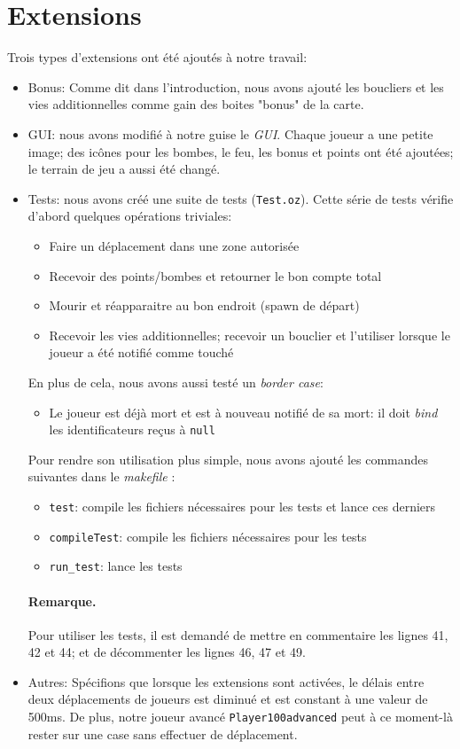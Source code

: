 \documentclass{article}
\begin{document}
\section{Extensions}
Trois types d'extensions ont été ajoutés à notre travail:
\begin{itemize}
	\item Bonus: Comme dit dans l'introduction, nous avons ajouté les boucliers et les vies additionnelles comme gain des boites "bonus" de la carte.
	\item GUI: nous avons modifié à notre guise le \emph{GUI}. Chaque joueur a une petite image; des icônes pour les bombes, le feu, les bonus et points ont été ajoutées; le terrain de jeu a aussi été changé.
	\item Tests: nous avons créé une suite de tests (\texttt{Test.oz}). Cette série de tests vérifie d'abord quelques opérations triviales:
		\begin{itemize}
			\item Faire un déplacement dans une zone autorisée
			\item Recevoir des points/bombes et retourner le bon compte total
			\item Mourir et réapparaitre au bon endroit (spawn de départ)
			\item Recevoir les vies additionnelles; recevoir un bouclier et l'utiliser lorsque le joueur a été notifié comme touché
		\end{itemize}
	En plus de cela, nous avons aussi testé un \emph{border case}:
		\begin{itemize}
			\item Le joueur est déjà mort et est à nouveau notifié de sa mort: il doit \emph{bind} les identificateurs reçus à \texttt{null}
			
		\end{itemize}
	Pour rendre son utilisation plus simple, nous avons ajouté les commandes suivantes dans le \emph{makefile} :
	\begin{itemize}
		\item \texttt{test}: compile les fichiers nécessaires pour les tests et lance ces derniers
		\item \texttt{compileTest}: compile les fichiers nécessaires pour les tests
		\item \texttt{run\_test}: lance les tests
	\end{itemize}
	\paragraph{Remarque.}Pour utiliser les tests, il est demandé de mettre en commentaire les lignes 41, 42 et 44; et de décommenter les lignes 46, 47 et 49.
	\item Autres: Spécifions que lorsque les extensions sont activées, le délais entre deux déplacements de joueurs est diminué et est constant à une valeur de 500ms. De plus, notre joueur avancé \texttt{Player100advanced} peut à ce moment-là rester sur une case sans effectuer de déplacement.
\end{itemize}
\end{document}
